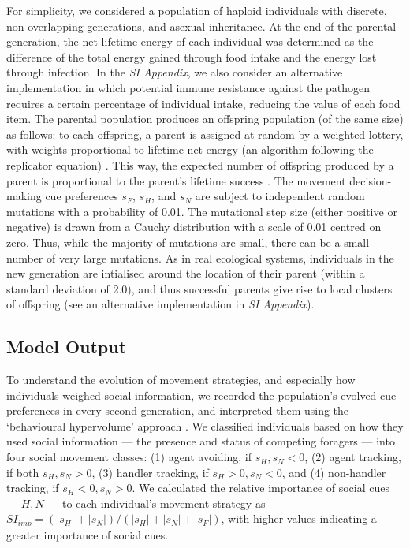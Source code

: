 For simplicity, we considered a population of haploid individuals with discrete, non-overlapping generations, and asexual inheritance.
At the end of the parental generation, the net lifetime energy of each individual was determined as the difference of the total energy gained through food intake and the energy lost through infection. 
In the \textit{SI Appendix}, we also consider an alternative implementation in which potential immune resistance against the pathogen requires a certain percentage of individual intake, reducing the value of each food item.
The parental population produces an offspring population (of the same size) as follows: to each offspring, a parent is assigned at random by a weighted lottery, with weights proportional to lifetime net energy (an algorithm following the replicator equation) \autocite{hofbauer1988,hamblin2013}.
This way, the expected number of offspring produced by a parent is proportional to the parent's lifetime success \autocite{hofbauer1988}.
The movement decision-making cue preferences $s_F$, $s_H$, and $s_N$ are subject to independent random mutations with a probability of 0.01.
The mutational step size (either positive or negative) is drawn from a Cauchy distribution with a scale of 0.01 centred on zero.
Thus, while the majority of mutations are small, there can be a small number of very large mutations.
As in real ecological systems, individuals in the new generation are intialised around the location of their parent (within a standard deviation of 2.0), and thus successful parents give rise to local clusters of offspring (see an alternative implementation in \textit{SI Appendix}).

\subsection*{Model Output}

To understand the evolution of movement strategies, and especially how individuals weighed social information, we recorded the population's evolved cue preferences in every second generation, and interpreted them using the `behavioural hypervolume' approach \autocite{bastille-rousseau2019}.
We classified individuals based on how they used social information --- the presence and status of competing foragers --- into four social movement classes: (1) agent avoiding, if $s_H, s_N < 0$, (2) agent tracking, if both $s_H, s_N > 0$, (3) handler tracking, if $s_H > 0, s_N < 0$, and (4) non-handler tracking, if $s_H < 0, s_N > 0$.
We calculated the relative importance of social cues --- $H, N$ --- to each individual's movement strategy as $ SI_{imp} = (|s_H| + |s_N|) / (|s_H| + |s_N| + |s_F|)$, with higher values indicating a greater importance of social cues.


